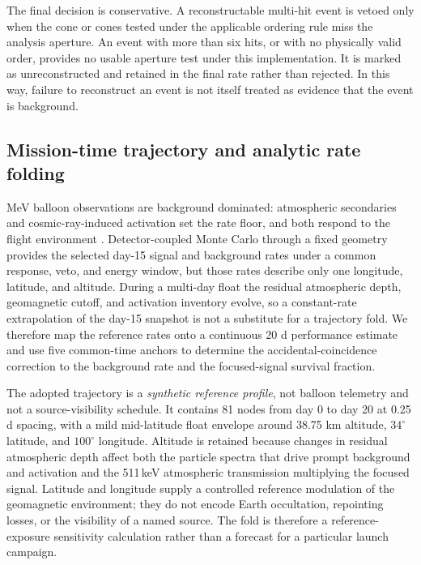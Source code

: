 \documentclass[11pt]{article}
\begin{document}
The final decision is conservative. A reconstructable multi-hit event is vetoed
only when the cone or cones tested under the applicable ordering rule miss the
analysis aperture. An event with more than six hits, or with no physically valid
order, provides no usable aperture test under this implementation. It is marked
as unreconstructed and retained in the final rate rather than rejected. In this
way, failure to reconstruct an event is not itself treated as evidence that the
event is background.

\subsection{Mission-time trajectory and analytic rate folding}
\label{sec:mission_time_fold}

MeV balloon observations are background dominated: atmospheric secondaries and
cosmic-ray-induced activation set the rate floor, and both respond to the flight
environment \cite{Gallego2025Balloon,Kierans2017}. Detector-coupled Monte Carlo
through a fixed geometry provides the selected day-15 signal and background
rates under a common response, veto, and energy window, but those rates describe
only one longitude, latitude, and altitude. During a multi-day float the residual
atmospheric depth, geomagnetic cutoff, and activation inventory evolve, so a
constant-rate extrapolation of the day-15 snapshot is not a substitute for a
trajectory fold. We therefore map the reference rates onto a continuous 20 d
performance estimate and use five common-time anchors to determine the
accidental-coincidence correction to the background rate and the focused-signal
survival fraction.

The adopted trajectory is a \emph{synthetic reference profile}, not balloon
telemetry and not a source-visibility schedule. It contains 81 nodes from day 0
to day 20 at 0.25 d spacing, with a mild mid-latitude float envelope around
38.75 km altitude, $34^\circ$ latitude, and $100^\circ$ longitude. Altitude is
retained because changes in residual atmospheric depth affect both the particle
spectra that drive prompt background and activation and the 511\,keV atmospheric
transmission multiplying the focused signal. Latitude and longitude supply a
controlled reference modulation of the geomagnetic environment; they do not
encode Earth occultation, repointing losses, or the visibility of a named source.
The fold is therefore a reference-exposure sensitivity calculation rather than a
forecast for a particular launch campaign.
\end{document}
